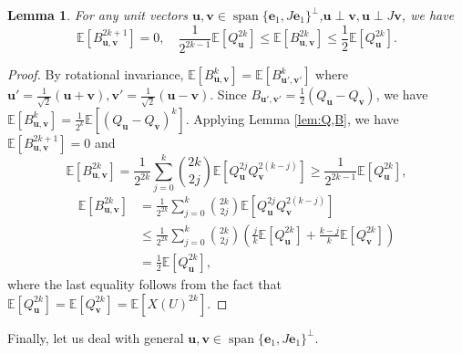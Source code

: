 \documentclass{amsart}
\theoremstyle{plain}
\newtheorem{lemma}{Lemma}
\theoremstyle{definition}
\theoremstyle{remark}
\newcommand{\EE}{\mathbb{E}}
\begin{document}
\begin{lemma}
    For any unit vectors $\bm u,\bm v\in\operatorname{span}\{\bm e_1,J\bm e_1\}^\perp$,$\bm u\perp \bm v,\bm u\perp J\bm v$,  we have 
    \begin{equation}
       \EE[B_{\bm u,\bm v}^{2k+1}]=0, \quad \frac{1}{2^{2k-1}}\EE[Q_{\bm u}^{2k}]\leq \EE[B_{\bm u,\bm v}^{2k}]\leq \frac{1}{2}\EE[Q_{\bm u}^{2k}]. 
    \end{equation}
    
\end{lemma}
\begin{proof}
    By rotational invariance, $\EE[B_{\bm u,\bm v}^{k}]=\EE[B_{\bm u',\bm v'}^{k}]$ where $\bm u'=\frac{1}{\sqrt 2}(\bm u+\bm v),\bm v'=\frac{1}{\sqrt{2}}(\bm u-\bm v)$. Since $B_{\bm u',\bm v'}=\frac{1}{2}(Q_{\bm u}-Q_{\bm v})$, we have $\EE[B_{\bm u,\bm v}^{k}]=\frac{1}{2^k}\EE[(Q_{\bm u}-Q_{\bm v})^k]$. Applying Lemma \ref{lem:Q,B}, we have $\EE[B_{\bm u,\bm v}^{2k+1}]=0$ and
    \[\EE[B_{\bm u,\bm v}^{2k}]=\frac{1}{2^{2k}}\sum\limits_{j=0}^{k}\binom{2k}{2j}\EE\left[Q_{\bm u}^{2j}Q_{\bm v}^{2(k-j)}\right]\geq\frac{1}{2^{2k-1}}\EE[Q_{\bm u}^{2k}],\]
    \begin{align*}
        \EE[B_{\bm u,\bm v}^{2k}]&=\frac{1}{2^{2k}}\sum\limits_{j=0}^{k}\binom{2k}{2j}\EE\left[Q_{\bm u}^{2j}Q_{\bm v}^{2(k-j)}\right]\\
        &\leq \frac{1}{2^{2k}}\sum\limits_{j=0}^{k}\binom{2k}{2j}\left(\frac{j}{k}\EE[Q_{\bm u}^{2k}]+\frac{k-j}{k}\EE[Q_{\bm v}^{2k}]\right)\\
        &=\frac{1}{2}\EE[Q_{\bm u}^{2k}],
    \end{align*}
    where the last equality follows from the fact that $\EE[Q_{\bm u}^{2k}]=\EE[Q_{\bm v}^{2k}]=\EE[X(U)^{2k}]$.
\end{proof}

Finally, let us deal with general $\bm u,\bm v\in\operatorname{span}\{\bm e_1,J\bm e_1\}^\perp$.
\end{document}

